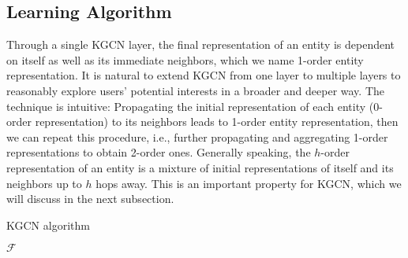 \documentclass[sigconf]{acmart}
\begin{document}
		
	\subsection{Learning Algorithm}
		Through a single KGCN layer, the final representation of an entity is dependent on itself as well as its immediate neighbors, which we name 1-order entity representation.
		It is natural to extend KGCN from one layer to multiple layers to reasonably explore users' potential interests in a broader and deeper way.
		The technique is intuitive:
		Propagating the initial representation of each entity (0-order representation) to its neighbors leads to 1-order entity representation, then we can repeat this procedure, i.e., further propagating and aggregating 1-order representations to obtain 2-order ones.
		Generally speaking, the $h$-order representation of an entity is a mixture of initial representations of itself and its neighbors up to $h$ hops away.
		This is an important property for KGCN, which we will discuss in the next subsection.
		
		\begin{algorithm}[t]
			\caption{KGCN algorithm}
			\label{alg:kgcn}
			\Return $\mathcal F$\;
			\BlankLine
{}
		\end{algorithm}
		
\end{document}
